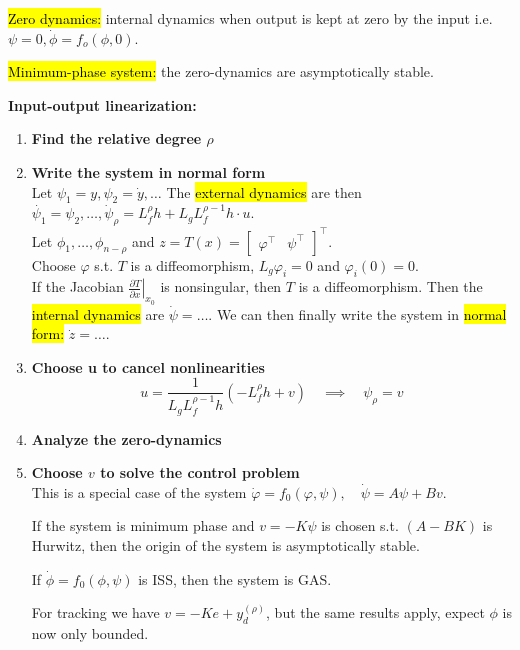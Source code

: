 \begin{definition}
   \hl{Zero dynamics:} internal dynamics when output is kept at zero by the input i.e. $\psi = 0, \dot{\phi} = f_o(\phi, 0)$.
\end{definition}
\begin{definition}
    \hl{Minimum-phase system:} the zero-dynamics are asymptotically stable.
\end{definition}

\begin{tcolorbox}[colback=white, colframe=teal]
    \textbf{Input-output linearization:}
    \begin{enumerate}
        \item \textbf{Find the relative degree $\rho$}
        \item \textbf{Write the system in normal form}\\
        Let $\psi_1 = y, \psi_2 = \dot{y}, \dots$
        The \hl{external dynamics} are then $\dot{\psi_1} = \psi_2, \dots, \dot{\psi}_{\rho}=L_{f}^{\rho} h+L_{g} L_{f}^{\rho-1} h \cdot u$.\\
        Let $\phi_1, \dots, \phi_{n-\rho}$ and $z = T(x) =
        [\begin{array}{cc}\varphi^{\top} & \psi^{\top} \end{array}]^{\top}$.\\
        Choose $\varphi$ s.t. $T$ is a diffeomorphism, $L_{g} \varphi_{i}=0$ and $\varphi_i(0)=0$.\\
        If the Jacobian $\left.\frac{\partial T}{\partial x}\right|_{x_{0}}$ is nonsingular, then $T$ is a diffeomorphism. Then the \hl{internal dynamics} are $\dot{\psi} = \dots$.
        We can then finally write the system in \hl{normal form:} $\dot{z} = \dots$.
        \item \textbf{Choose u to cancel nonlinearities}
        \begin{equation}
            u=\frac{1}{L_{g} L_{f}^{\rho-1} h}\left(-L_{f}^{\rho} h+v\right) \quad \implies \quad \psi_{\rho} = v
        \end{equation}
        \item \textbf{Analyze the zero-dynamics}
        \item \textbf{Choose $v$ to solve the control problem}\\
        This is a special case of the system $\dot{\varphi}=f_{0}(\varphi, \psi), \quad \dot{\psi}=A \psi+B v$.
        \begin{lemma}
            If the system is minimum phase and $v=-K\psi$ is chosen s.t. $(A-BK)$ is Hurwitz, then the origin of the system is asymptotically stable.
        \end{lemma}
        \begin{lemma}
            If $\dot{\phi} = f_0(\phi, \psi)$ is ISS, then the system is GAS.
        \end{lemma}
        For tracking we have $v=-K e+y_{d}^{(\rho)}$, but the same results apply, expect $\phi$ is now only bounded.
    \end{enumerate}
\end{tcolorbox}

